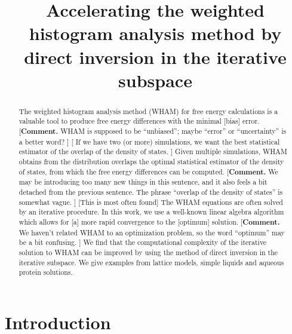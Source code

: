 \documentclass[reprint,aip,jcp,superscriptaddress]{revtex4-1}
\begin{document}
\newcommand{\vct}[1]{\mathbf{#1}}
\newcommand{\vx}{\vct{x}}
\newcommand{\vy}{\vct{y}}
\newcommand{\Z}{\mathcal{Z}}
\newcommand{\E}{\mathcal{E}}
\newcommand{\Ham}{\mathcal{H}}
\newcommand{\W}{\mathcal{W}}
\newcommand{\A}{\mathcal{A}}

\newcommand{\repl}[2]{{\color{gray} [#1] }{\color{blue} #2}}
\newcommand{\add}[1]{{\color{blue} #1}}
\newcommand{\del}[1]{{\color{gray} [#1]}}
\newcommand{\note}[1]{{\color{OliveGreen}\small [\textbf{Comment.} #1]}}



\title{Accelerating the weighted histogram analysis method
by direct inversion in the iterative subspace}

\begin{abstract}
The weighted histogram analysis method (WHAM)
for free energy calculations
is a valuable tool to produce
free energy differences with the minimal \repl{bias}{error}.
\note{
WHAM is supposed to be ``unbiased'';
maybe ``error'' or ``uncertainty'' is a better word?
}
%
\repl{
If we have two (or more) simulations,
we want the best statistical estimator
of the overlap of the density of states.
}
{
Given multiple simulations,
WHAM obtains
from the distribution overlaps
the optimal statistical estimator
of the density of states,
from which the free energy differences
can be computed.
}
%
\note{
We may be introducing too many new things in this sentence,
and it also feels a bit detached from the previous sentence.
The phrase ``overlap of the density of states'' is somewhat vague.
}
%
\repl{This is most often found}{The WHAM equations are often solved}
by an iterative procedure.
%
In this work,
we use a well-known linear algebra algorithm
which allows for
\repl{a}{more}
rapid convergence to the \repl{optimum}{solution}.
%
\note{
We haven't related WHAM to an optimization problem,
so the word ``optimum'' may be a bit confusing.
}
%
We find \add{that} the computational complexity of
the iterative solution to WHAM
can be improved by using the method of
direct inversion in the iterative subspace.
%
We give examples from
\add{lattice models,}
simple liquids
and aqueous protein solutions.
\end{abstract}

\maketitle




\section{Introduction}
\end{document}
